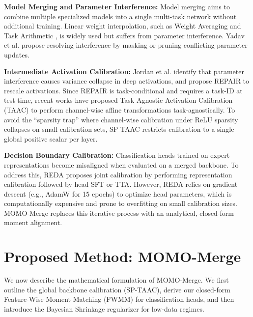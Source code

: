 \documentclass{article}
\theoremstyle{plain}
\theoremstyle{definition}
\theoremstyle{remark}
\begin{document}
\textbf{Model Merging and Parameter Interference:} Model merging aims to combine multiple specialized models into a single multi-task network without additional training. Linear weight interpolation, such as Weight Averaging \cite{Wortsman22} and Task Arithmetic \cite{Ilharco22}, is widely used but suffers from parameter interference. Yadav et al. \cite{Yadav23} propose resolving interference by masking or pruning conflicting parameter updates.

\textbf{Intermediate Activation Calibration:} Jordan et al. \cite{Jordan23} identify that parameter interference causes variance collapse in deep activations, and propose REPAIR to rescale activations. Since REPAIR is task-conditional and requires a task-ID at test time, recent works have proposed Task-Agnostic Activation Calibration (TAAC) \cite{TAAC26} to perform channel-wise affine transformations task-agnostically. To avoid the ``sparsity trap'' where channel-wise calibration under ReLU sparsity collapses on small calibration sets, SP-TAAC \cite{SPTAAC26} restricts calibration to a single global positive scalar per layer.

\textbf{Decision Boundary Calibration:} Classification heads trained on expert representations become misaligned when evaluated on a merged backbone. To address this, REDA \cite{REDA26} proposes joint calibration by performing representation calibration followed by head SFT or TTA. However, REDA relies on gradient descent (e.g., AdamW for 15 epochs) to optimize head parameters, which is computationally expensive and prone to overfitting on small calibration sizes. MOMO-Merge replaces this iterative process with an analytical, closed-form moment alignment.

\section{Proposed Method: MOMO-Merge}
\label{sec:method}

We now describe the mathematical formulation of MOMO-Merge. We first outline the global backbone calibration (SP-TAAC), derive our closed-form Feature-Wise Moment Matching (FWMM) for classification heads, and then introduce the Bayesian Shrinkage regularizer for low-data regimes.
\end{document}
